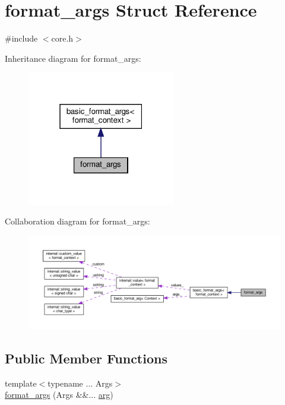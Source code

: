 \hypertarget{structformat__args}{}\section{format\+\_\+args Struct Reference}
\label{structformat__args}


{\ttfamily \#include $<$core.\+h$>$}



Inheritance diagram for format\+\_\+args\+:
\nopagebreak
\begin{figure}[H]
\begin{center}
\leavevmode
\includegraphics[width=183pt]{structformat__args__inherit__graph}
\end{center}
\end{figure}


Collaboration diagram for format\+\_\+args\+:
\nopagebreak
\begin{figure}[H]
\begin{center}
\leavevmode
\includegraphics[width=350pt]{structformat__args__coll__graph}
\end{center}
\end{figure}
\subsection*{Public Member Functions}
\begin{DoxyCompactItemize}
\item 
{\footnotesize template$<$typename ... Args$>$ }\\\hyperlink{structformat__args_a42e4d5e4499e5164fa9a85424e2d80c3}{format\+\_\+args} (Args \&\&... \hyperlink{core_8h_ab87859023d64d26171b1e74a3d0c3b99}{arg})
\end{DoxyCompactItemize}
